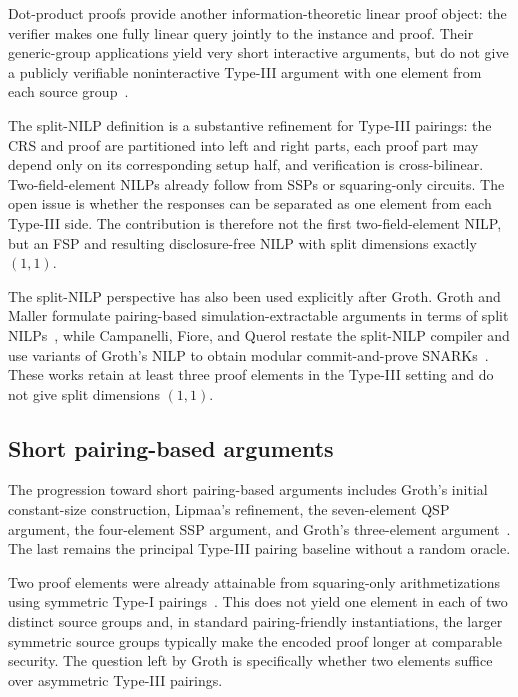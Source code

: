 \documentclass[11pt]{article}
\theoremstyle{definition}
\begin{document}
Dot-product proofs provide another information-theoretic linear proof object:
the verifier makes one fully linear query jointly to the instance and proof.
Their generic-group applications yield very short interactive arguments, but
do not give a publicly verifiable noninteractive Type-III argument with one
element from each source group~\cite{DPP24}.

The split-NILP definition is a substantive refinement for Type-III pairings:
the CRS and proof are partitioned into left and right parts, each proof part
may depend only on its corresponding setup half, and verification is
cross-bilinear.  Two-field-element NILPs already follow from SSPs or
squaring-only circuits.  The open issue is whether the responses can be
separated as one element from each Type-III side.  The contribution is
therefore not the first two-field-element NILP, but an FSP and
resulting disclosure-free NILP with split dimensions exactly $(1,1)$.

The split-NILP perspective has also been used explicitly after Groth.
Groth and Maller formulate pairing-based simulation-extractable arguments in
terms of split NILPs~\cite{GM17}, while Campanelli, Fiore, and Querol restate
the split-NILP compiler and use variants of Groth's NILP to obtain modular
commit-and-prove SNARKs~\cite{LegoSNARK19}.  These works retain at least three
proof elements in the Type-III setting and do not give split dimensions
$(1,1)$.

\subsection{Short pairing-based arguments}

The progression toward short pairing-based arguments includes Groth's initial
constant-size construction, Lipmaa's refinement, the seven-element QSP
argument, the four-element SSP argument, and Groth's three-element
argument~\cite{Groth10,Lipmaa12,GGPR13,DFGK14,Groth16}.  The last remains the
principal Type-III pairing baseline without a random oracle.

Two proof elements were already attainable from squaring-only arithmetizations
using symmetric Type-I pairings~\cite{Groth16}.  This does not yield one
element in each of two distinct source groups and, in standard pairing-friendly
instantiations, the larger symmetric source groups typically make the encoded
proof longer at comparable security.  The question left by Groth is
specifically whether two elements suffice over asymmetric Type-III pairings.
\end{document}
